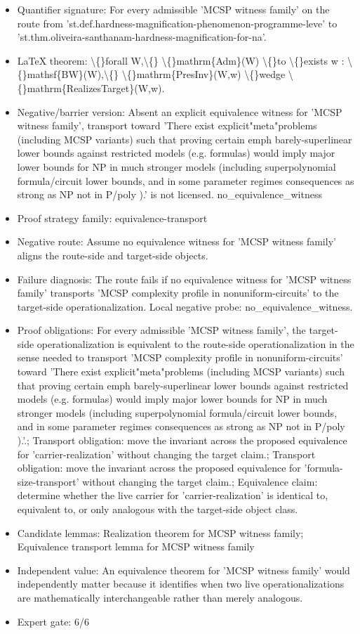 \documentclass[11pt]{article}
\begin{document}
\begin{itemize}
\item Quantifier signature: For every admissible 'MCSP witness family' on the route from 'st.def.hardness-magnification-phenomenon-programme-leve' to 'st.thm.oliveira-santhanam-hardness-magnification-for-na'.
\item LaTeX theorem: \textbackslash\{\}forall W,\textbackslash\{\} \textbackslash\{\}mathrm\{Adm\}(W) \textbackslash\{\}to \textbackslash\{\}exists w : \textbackslash\{\}mathsf\{BW\}(W),\textbackslash\{\} \textbackslash\{\}mathrm\{PresInv\}(W,w) \textbackslash\{\}wedge \textbackslash\{\}mathrm\{RealizesTarget\}(W,w).
\item Negative/barrier version: Absent an explicit equivalence witness for 'MCSP witness family', transport toward 'There exist explicit"meta"problems (including MCSP variants) such that proving certain emph barely-superlinear lower bounds against restricted models (e.g. formulas) would imply major lower bounds for NP in much stronger models (including superpolynomial formula/circuit lower bounds, and in some parameter regimes consequences as strong as NP not in P/poly ).' is not licensed. no\_equivalence\_witness
\item Proof strategy family: equivalence-transport
\item Negative route: Assume no equivalence witness for 'MCSP witness family' aligns the route-side and target-side objects.
\item Failure diagnosis: The route fails if no equivalence witness for 'MCSP witness family' transports 'MCSP complexity profile in nonuniform-circuits' to the target-side operationalization. Local negative probe: no\_equivalence\_witness.
\item Proof obligations: For every admissible 'MCSP witness family', the target-side operationalization is equivalent to the route-side operationalization in the sense needed to transport 'MCSP complexity profile in nonuniform-circuits' toward 'There exist explicit"meta"problems (including MCSP variants) such that proving certain emph barely-superlinear lower bounds against restricted models (e.g. formulas) would imply major lower bounds for NP in much stronger models (including superpolynomial formula/circuit lower bounds, and in some parameter regimes consequences as strong as NP not in P/poly ).'.; Transport obligation: move the invariant across the proposed equivalence for 'carrier-realization' without changing the target claim.; Transport obligation: move the invariant across the proposed equivalence for 'formula-size-transport' without changing the target claim.; Equivalence claim: determine whether the live carrier for 'carrier-realization' is identical to, equivalent to, or only analogous with the target-side object class.
\item Candidate lemmas: Realization theorem for MCSP witness family; Equivalence transport lemma for MCSP witness family
\item Independent value: An equivalence theorem for 'MCSP witness family' would independently matter because it identifies when two live operationalizations are mathematically interchangeable rather than merely analogous.
\item Expert gate: 6/6
\end{itemize}
\end{document}
